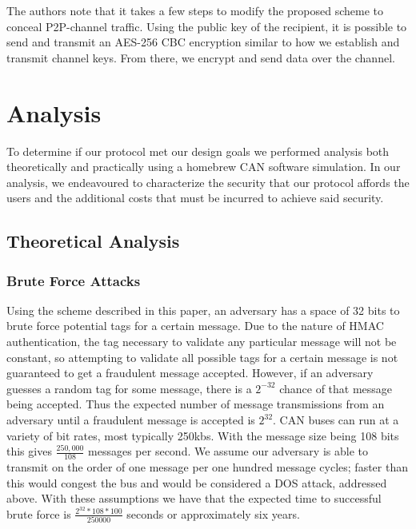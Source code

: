 \documentclass{article}
\begin{document}
    The authors note that it takes a few steps to modify the proposed scheme to conceal P2P-channel traffic. Using the public key of the recipient, it is possible to send and transmit an AES-256 CBC encryption similar to how we establish and transmit channel keys. From there, we encrypt and send data over the channel.
    
    \section{Analysis}
    To determine if our protocol met our design goals we performed analysis both theoretically and practically using a homebrew CAN software simulation. In our analysis, we endeavoured to characterize the security that our protocol affords the users and the additional costs that must be incurred to achieve said security.

    \subsection{Theoretical Analysis}
    \subsubsection{Brute Force Attacks} 
    Using the scheme described in this paper, an adversary has a space of 32 bits to brute force potential tags for a certain message. Due to the nature of HMAC authentication, the tag necessary to validate any particular message will not be constant, so attempting to validate all possible tags for a certain message is not guaranteed to get a fraudulent message accepted. However, if an adversary guesses a random tag for some message, there is a $2^{-32}$ chance of that message being accepted. Thus the expected number of message transmissions from an adversary until a fraudulent message is accepted is $2^{32}$. CAN buses can run at a variety of bit rates, most typically 250kbs. With the message size being 108 bits this gives $\frac{250,000}{108}$ messages per second. We assume our adversary is able to transmit on the order of one message per one hundred message cycles; faster than this would congest the bus and would be considered a DOS attack, addressed above. With these assumptions we have that the expected time to successful brute force is $\frac{2^{32}*108*100}{250000}$ seconds or approximately six years.
    
\end{document}
